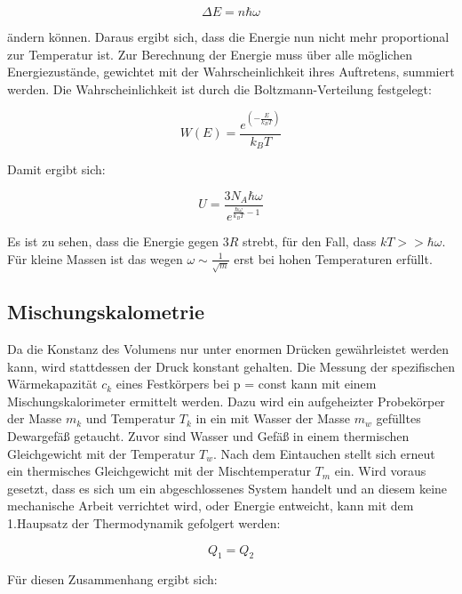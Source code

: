 \begin{equation*}
\Delta E = n \hbar \omega
\end{equation*}

ändern können. Daraus ergibt sich, dass die Energie nun
nicht mehr proportional zur Temperatur ist.
Zur Berechnung der Energie muss über alle möglichen 
Energiezustände, gewichtet mit der Wahrscheinlichkeit
ihres Auftretens, summiert werden. Die Wahrscheinlichkeit
ist durch die Boltzmann-Verteilung festgelegt: 

\begin{equation*}
W(E) = \frac{e^{\left(-\frac{E}{k_B T}\right)}}{k_B T}
\end{equation*}

Damit ergibt sich:

\begin{equation*}
U = \frac{3 N_A \hbar \omega}{e^{\frac{\hbar \omega}{k_B T} - 1}}
\end{equation*}

Es ist zu sehen, dass die Energie gegen $3R$ strebt, für den
Fall, dass $kT >> \hbar \omega$. Für kleine Massen ist das
wegen $\omega \sim \frac{1}{\sqrt{m}}$ erst bei 
hohen Temperaturen erfüllt. 

\subsection{Mischungskalometrie}

Da die Konstanz des Volumens nur unter enormen Drücken 
gewährleistet werden kann, wird stattdessen der Druck 
konstant gehalten. 
Die Messung der spezifischen Wärmekapazität $c_k$ eines 
Festkörpers bei p = const kann mit einem Mischungskalorimeter
ermittelt werden.
Dazu wird ein aufgeheizter Probekörper der Masse $m_k$ und 
Temperatur $T_k$ in ein mit Wasser der Masse $m_w$ gefülltes 
Dewargefäß getaucht. Zuvor sind Wasser und Gefäß in einem
thermischen Gleichgewicht mit der Temperatur $T_w$. 
Nach dem Eintauchen stellt sich erneut ein thermisches 
Gleichgewicht mit der Mischtemperatur $T_m$ ein. 
Wird voraus gesetzt, dass es sich um ein abgeschlossenes 
System handelt und an diesem keine mechanische Arbeit 
verrichtet wird, oder Energie entweicht, kann mit dem
1.Haupsatz der Thermodynamik gefolgert werden:

\begin{equation*}
Q_1 = Q_2
\end{equation*}

Für diesen Zusammenhang ergibt sich: 

